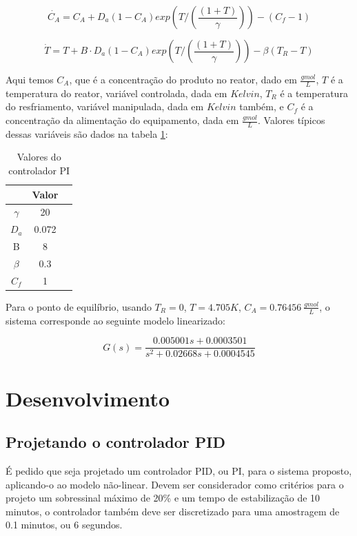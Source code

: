 \documentclass[
	12pt,				%
	openany,			%
	oneside,			%
	a4paper,			%
	english,			%
	french,				%
	spanish,			%
	brazil,				%
	]{abntex2}
\begin{document}
{\begin{equation}
	\dot{C_A} = C_A + D_a(1-C_A)exp\left(T/\left(\frac{(1+T)}{\gamma}\right)\right) - (C_f - 1)
\end{equation}

\begin{equation}
	\dot{T} = T + B \cdot D_a(1-C_A)exp\left(T/\left(\frac{(1+T)}{\gamma}\right)\right) - \beta(T_R - T)
\end{equation}

Aqui temos $C_A$, que é a concentração do produto no reator, dado em $\frac{gmol}{L}$, $T$ é a temperatura do reator, variável controlada, dada em $Kelvin$, $T_R$ é a temperatura do resfriamento, variável manipulada, dada em $Kelvin$ também, e $C_f$ é a concentração da alimentação do equipamento, dada em $\frac{gmol}{L}$. Valores típicos dessas variáveis são dados na tabela \ref{tab:tabela_constantes}:

\begin{table}[h]
	\centering
	\begin{tabular}{ccc}
		\multicolumn{1}{c}{} 
	Constante & Valor &  \\ \hline
	$\gamma$ & 20 &  \\
	$D_a$ & 0.072 &  \\
	B & 8 &  \\
	$\beta$ & 0.3 &  \\
	$C_f$ & 1 & 
	\end{tabular}
	\caption{Valores do controlador PI}
	\label{tab:tabela_constantes}
\end{table}

Para o ponto de equilíbrio, usando $T_R=0$, $T=4.705K$, $C_A = 0.76456 \ \frac{gmol}{L}$, o sistema corresponde ao seguinte modelo linearizado:

\begin{equation}
	G(s) = \frac{0.005001s + 0.0003501}{s^2+0.02668s+0.0004545}
\end{equation}



\chapter{Desenvolvimento}

\section{Projetando o controlador PID}

É pedido que seja projetado um controlador PID, ou PI, para o sistema proposto, aplicando-o ao modelo não-linear. Devem ser considerador como critérios para o projeto um sobressinal máximo de 20\% e um tempo de estabilização de 10 minutos, o controlador também deve ser discretizado para uma amostragem de 0.1 minutos, ou 6 segundos.

}
\end{document}
